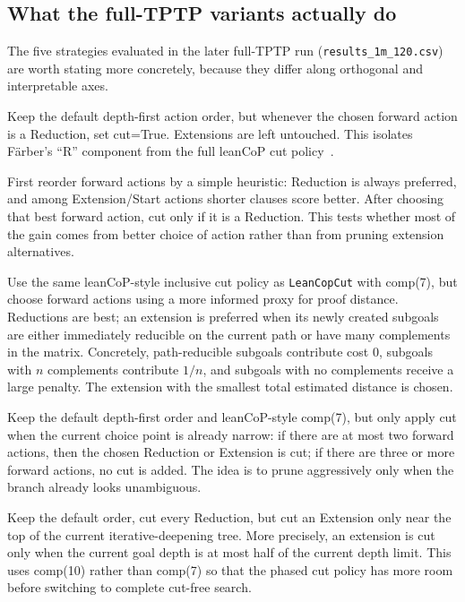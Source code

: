 \documentclass[11pt,twocolumn]{article}
\newcommand{\atom}[1]{\colorbox{Gray!30}{\ttfamily #1}}
\newcommand{\citen}[1]{~\parencite{#1}}
\begin{document}
\subsection*{What the full-TPTP variants actually do}

The five strategies evaluated in the later full-TPTP run (\texttt{results\_1m\_120.csv}) are worth stating more concretely, because they differ along orthogonal and interpretable axes.

\begin{description}[style=nextline, itemsep=-3pt, leftmargin=18pt]
	\item[ReductionCut] Keep the default depth-first action order, but whenever the chosen forward action is a \atom{Reduction}, set \atom{cut=True}. Extensions are left untouched. This isolates Färber's ``R'' component from the full leanCoP cut policy\citen{farberCuriouslyEffectiveBacktracking2024}.
	\item[HeuristicReductionCut] First reorder forward actions by a simple heuristic: \atom{Reduction} is always preferred, and among \atom{Extension}/\atom{Start} actions shorter clauses score better. After choosing that best forward action, cut only if it is a \atom{Reduction}. This tests whether most of the gain comes from better choice of action rather than from pruning extension alternatives.
	\item[GoalDistanceCut] Use the same leanCoP-style inclusive cut policy as \texttt{LeanCopCut} with \atom{comp(7)}, but choose forward actions using a more informed proxy for proof distance. Reductions are best; an extension is preferred when its newly created subgoals are either immediately reducible on the current path or have many complements in the matrix. Concretely, path-reducible subgoals contribute cost 0, subgoals with $n$ complements contribute $1/n$, and subgoals with no complements receive a large penalty. The extension with the smallest total estimated distance is chosen.
	\item[FewAlternativesCut] Keep the default depth-first order and leanCoP-style \atom{comp(7)}, but only apply \atom{cut} when the current choice point is already narrow: if there are at most two forward actions, then the chosen \atom{Reduction} or \atom{Extension} is cut; if there are three or more forward actions, no cut is added. The idea is to prune aggressively only when the branch already looks unambiguous.
	\item[DepthPhasedCut] Keep the default order, cut every \atom{Reduction}, but cut an \atom{Extension} only near the top of the current iterative-deepening tree. More precisely, an extension is cut only when the current goal depth is at most half of the current depth limit. This uses \atom{comp(10)} rather than \atom{comp(7)} so that the phased cut policy has more room before switching to complete cut-free search.
\end{description}
\end{document}

